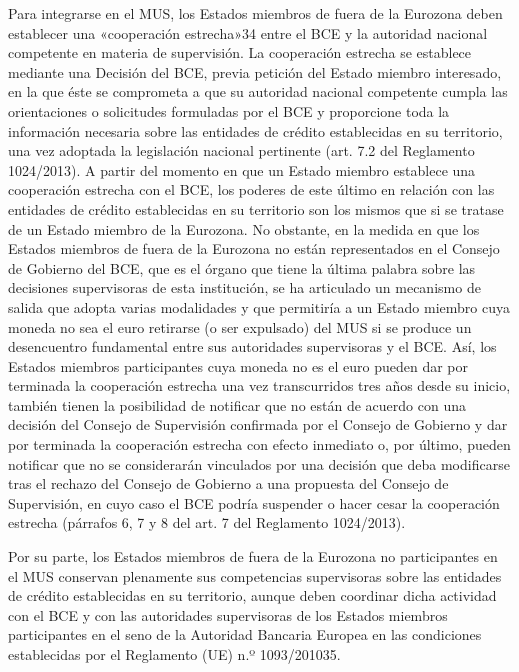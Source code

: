 \documentclass[10pt,a4paper]{article}
\begin{document}
Para integrarse en el MUS, los Estados miembros de fuera de la Eurozona deben establecer una «cooperación estrecha»34 entre el BCE y la autoridad nacional competente en materia de supervisión. La cooperación estrecha se establece mediante una Decisión del BCE, previa petición del Estado miembro interesado, en la que éste se comprometa a que su autoridad nacional competente cumpla las orientaciones o solicitudes formuladas por el BCE y proporcione toda la información necesaria sobre las entidades de crédito establecidas en su territorio, una vez adoptada la legislación nacional pertinente (art. 7.2 del Reglamento 1024/2013). A partir del momento en que un Estado miembro establece una cooperación estrecha con el BCE, los poderes de este último en relación con las entidades de crédito establecidas en su territorio son los mismos que si se tratase de un Estado miembro de la Eurozona. No obstante, en la medida en que los Estados miembros de fuera de la Eurozona no están representados en el Consejo de Gobierno del BCE, que es el órgano que tiene la última palabra sobre las decisiones supervisoras de esta institución, se ha articulado un mecanismo de salida que adopta varias modalidades y que permitiría a un Estado miembro cuya moneda no sea el euro retirarse (o ser expulsado) del MUS si se produce un desencuentro fundamental entre sus autoridades supervisoras y el BCE. Así, los Estados miembros participantes cuya moneda no es el euro pueden dar por terminada la cooperación estrecha una vez transcurridos tres años desde su inicio, también tienen la posibilidad de notificar que no están de acuerdo con una decisión del Consejo de Supervisión confirmada por el Consejo de Gobierno y dar por terminada la cooperación estrecha con efecto inmediato o, por último, pueden notificar que no se considerarán vinculados por una decisión que deba modificarse tras el rechazo del Consejo de Gobierno a una propuesta del Consejo de Supervisión, en cuyo caso el BCE podría suspender o hacer cesar la cooperación estrecha (párrafos 6, 7 y 8 del art. 7 del Reglamento 1024/2013). 

Por su parte, los Estados miembros de fuera de la Eurozona no participantes en el MUS conservan plenamente sus competencias supervisoras sobre las entidades de crédito establecidas en su territorio, aunque deben coordinar dicha actividad con el BCE y con las autoridades supervisoras de los Estados miembros participantes en el seno de la Autoridad Bancaria Europea en las condiciones establecidas por el Reglamento (UE) n.º 1093/201035.
\end{document}
